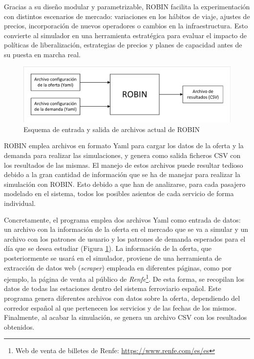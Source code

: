 Gracias a su diseño modular y parametrizable, \acrshort{ROBIN} facilita la experimentación con distintos escenarios de mercado: variaciones en los hábitos de viaje, ajustes de precios, incorporación de nuevos operadores o cambios en la infraestructura. Esto convierte al simulador en una herramienta estratégica para evaluar el impacto de políticas de liberalización, estrategias de precios y planes de capacidad antes de su puesta en marcha real.

\begin{figure}[H]
\centering
\includegraphics[width=.9\textwidth]{fig/Diagramas/Esquema ROBIN.pdf}
\caption{Esquema de entrada y salida de archivos actual de \acrshort{ROBIN}}
\label{fig:esquemaROBIN}
\end{figure} 

\acrshort{ROBIN} emplea archivos en formato \acrfull{Yaml} para cargar los datos de la oferta y la demanda para realizar las simulaciones, y genera como salida ficheros \acrfull{CSV} con los resultados de las mismas. El manejo de estos archivos puede resultar tedioso debido a la gran cantidad de información que se ha de manejar para realizar la simulación con \acrshort{ROBIN}. Esto debido a que han de analizarse, para cada pasajero modelado en el sistema, todos los posibles asientos de cada servicio de forma individual. 

Concretamente, el programa emplea dos archivos \acrshort{Yaml} como entrada de datos: un archivo con la información de la oferta en el mercado que se va a simular y un archivo con los patrones de usuario y los patrones de demanda esperados para el día que se desea estudiar (Figura \ref{fig:esquemaROBIN}). La información de la oferta, que posteriormente se usará en el simulador, proviene de una herramienta de extracción de datos web (\textit{scraper}) empleada en diferentes páginas, como por ejemplo, la página de venta al público de \textit{Renfe}\footnote{Web de venta de billetes de Renfe: \href{https://www.renfe.com/es/es}{https://www.renfe.com/es/es}}. De esta forma, se recopilan los datos de todas las estaciones dentro del sistema ferroviario español. Este programa genera diferentes archivos con datos sobre la oferta, dependiendo del corredor español al que pertenecen los servicios y de las fechas de los mismos. Finalmente, al acabar la simulación, se genera un archivo \acrshort{CSV} con los resultados obtenidos. 

